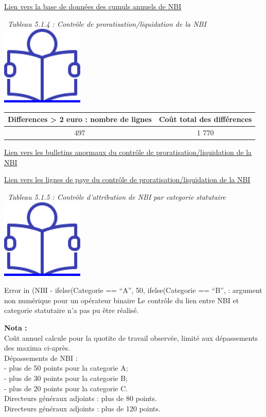 \href{../Bases/Fiabilite/cumuls.nbi.csv}{Lien vers la base de données des
cumuls annuels de NBI}

~\emph{Tableau 5.1.4 : Contrôle de proratisation/liquidation de la NBI}
~
\href{../Docs/Notices/fiche_NBI_prorat.odt}{\includegraphics{icones/Notice.png}}

\begin{longtable}[]{@{}cc@{}}
\toprule
Differences \textgreater{} 2 euro : nombre de lignes & Coût total des
différences\tabularnewline
\midrule
\endhead
497 & 1 770\tabularnewline
\bottomrule
\end{longtable}

\href{../Bases/Fiabilite/lignes.nbi.anormales.mensuel.csv}{Lien vers les
bulletins anormaux du contrôle de proratisation/liquidation de la NBI}

\href{../Bases/Fiabilite/lignes.paie.nbi.anormales.mensuel.csv}{Lien vers
les lignes de paye du contrôle de proratisation/liquidation de la NBI}

~\emph{Tableau 5.1.5 : Contrôle d'attribution de NBI par categorie
statutaire} ~
\href{../Docs/Notices/fiche_plafonds_NBI.odt}{\includegraphics{icones/Notice.png}}

Error in (NBI - ifelse(Categorie == ``A'', 50, ifelse(Categorie ==
``B'', : argument non numérique pour un opérateur binaire Le contrôle du
lien entre NBI et categorie statutaire n'a pas pu être réalisé.

\textbf{Nota :}\\
Coût annuel calcule pour la quotite de travail observée, limité aux
dépassements des maxima ci-après.\\
Dépassements de NBI :\\
- plus de 50 points pour la categorie A;\\
- plus de 30 points pour la categorie B;\\
- plus de 20 points pour la categorie C.\\
Directeurs généraux adjoints : plus de 80 points.\\
Directeurs généraux adjoints : plus de 120 points.


